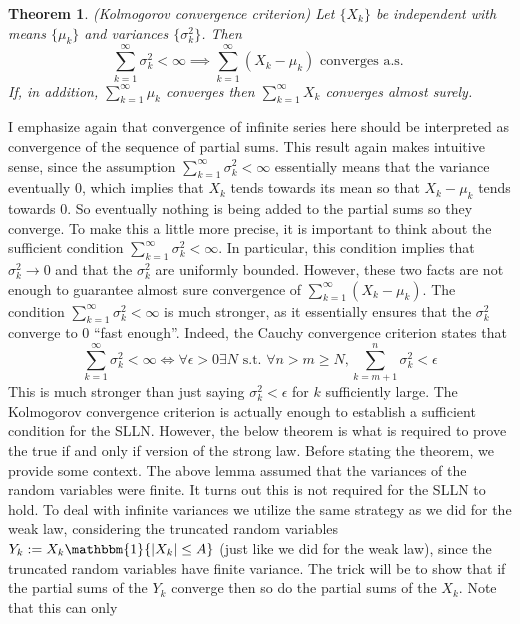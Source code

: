 \documentclass[12pt]{article}
\newcommand*{\abs}[1]{\left\lvert#1\right\rvert}
\newtheorem{thm}{Theorem}
\begin{document}
\begin{thm} \label{Kolmogorov_convergence_criterion}
(Kolmogorov convergence criterion) Let $\{X_k\}$ be independent with means $\{\mu_k\}$ and variances $\{\sigma_k^2\}$. Then 
\[\sum_{k = 1}^{\infty} \sigma_k^2 < \infty \implies \sum_{k = 1}^{\infty} (X_k - \mu_k) \text{ converges a.s. }\]
If, in addition, $\sum_{k = 1}^{\infty} \mu_k$ converges then $\sum_{k = 1}^{\infty} X_k$ converges almost surely. 
\end{thm}
I emphasize again that convergence of infinite series here should be interpreted as convergence of the sequence of partial sums. This result again makes intuitive sense, since the assumption 
$\sum_{k = 1}^{\infty} \sigma_k^2 < \infty$ essentially means that the variance eventually $0$, which implies that $X_k$ tends towards its mean so that $X_k - \mu_k$ tends towards $0$. So eventually 
nothing is being added to the partial sums so they converge. To make this a little more precise, it is important to think about the sufficient condition $\sum_{k = 1}^{\infty} \sigma_k^2 < \infty$. In particular, 
this condition implies that $\sigma_k^2 \to 0$ and that the $\sigma_k^2$ are uniformly bounded. However, these two facts are not enough to guarantee almost sure convergence of $\sum_{k = 1}^{\infty} (X_k - \mu_k)$. 
The condition $\sum_{k = 1}^{\infty} \sigma_k^2 < \infty$ is much stronger, as it essentially ensures that the $\sigma_k^2$ converge to $0$ ``fast enough''. Indeed, the Cauchy convergence criterion states that 
\[\sum_{k = 1}^{\infty} \sigma_k^2 < \infty \iff \forall \epsilon > 0 \exists N \text{ s.t. } \forall n > m \geq N, \sum_{k = m + 1}^{n} \sigma_k^2 < \epsilon\]
This is much stronger than just saying $\sigma_k^2 < \epsilon$ for $k$ sufficiently large. The Kolmogorov convergence criterion is actually enough to establish a sufficient condition for the SLLN. However, the below theorem
is what is required to prove the true if and only if version of the strong law. Before stating the theorem, we provide some context. The above lemma assumed that the variances of the random variables were 
finite. It turns out this is not required for the SLLN to hold. To deal with infinite variances we utilize the same strategy as we did for the weak law, considering the truncated random variables
$Y_k := X_k \mathbbm{1}\{\abs{X_k} \leq A\}$ (just like we did for the weak law), since the truncated random variables have finite variance. 
The trick will be to show that if the partial sums of the $Y_k$ converge then so do the partial sums of the $X_k$. Note that this can only 
\end{document}
